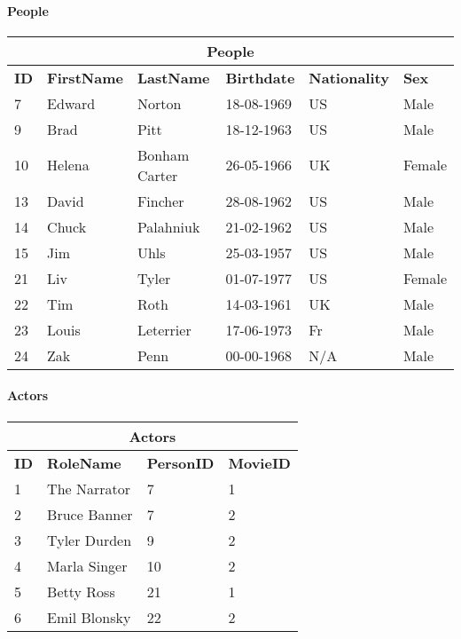 \paragraph{People}
\begin{center}
\begin{tabular}{|l|l|l|l|l|l|}
\hline
\multicolumn{6}{|c|}{People} \\ \hline \hline
\textbf{ID} & \textbf{FirstName} & \textbf{LastName} & \textbf{Birthdate} & \textbf{Nationality} & \textbf{Sex} \\ \hline \hline
7 & Edward & Norton & 18-08-1969 & US & Male \\ \hline
9 & Brad & Pitt & 18-12-1963 & US & Male \\ \hline
10 & Helena & Bonham Carter & 26-05-1966 & UK & Female \\ \hline
13 & David & Fincher & 28-08-1962 & US & Male \\ \hline
14 & Chuck & Palahniuk & 21-02-1962 & US & Male \\ \hline
15 & Jim & Uhls & 25-03-1957 & US & Male \\ \hline
21 & Liv & Tyler & 01-07-1977 & US & Female \\ \hline
22 & Tim & Roth & 14-03-1961 & UK & Male \\ \hline
23 & Louis & Leterrier & 17-06-1973 & Fr & Male \\ \hline
24 & Zak & Penn & 00-00-1968 & N/A & Male \\ \hline
\end{tabular}
\end{center}

\paragraph{Actors}
\begin{center}
\begin{tabular}{|l|l|l|l|}
\hline
\multicolumn{4}{|c|}{Actors} \\ \hline \hline
\textbf{ID} & \textbf{RoleName} & \textbf{PersonID} & \textbf{MovieID} \\ \hline \hline
1 & The Narrator & 7 & 1 \\ \hline
2 & Bruce Banner & 7 & 2 \\ \hline
3 & Tyler Durden & 9 & 2 \\ \hline
4 & Marla Singer & 10 & 2 \\ \hline
5 & Betty Ross & 21 & 1 \\ \hline
6 & Emil Blonsky & 22 & 2 \\\hline 
\end{tabular}
\end{center}

